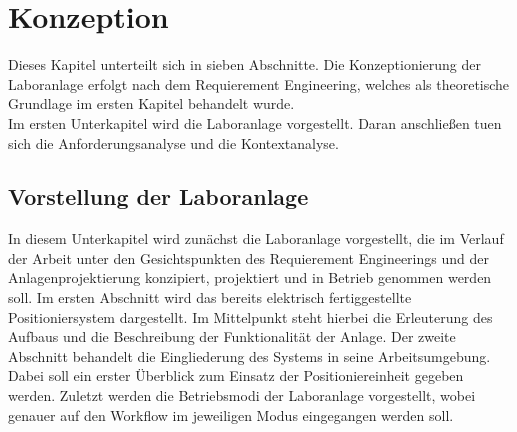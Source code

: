 \documentclass[../Bachelorarbeit.tex]{subfiles}
\begin{document}
\section{Konzeption}
Dieses Kapitel unterteilt sich in sieben Abschnitte. Die Konzeptionierung der Laboranlage erfolgt nach dem Requierement Engineering, welches als theoretische Grundlage im ersten Kapitel behandelt wurde.\\
Im ersten Unterkapitel wird die Laboranlage vorgestellt. Daran anschließen tuen sich die Anforderungsanalyse und die Kontextanalyse.

\subsection{Vorstellung der Laboranlage}
In diesem Unterkapitel wird zunächst die Laboranlage vorgestellt, die im Verlauf der Arbeit unter den Gesichtspunkten des Requierement Engineerings und der Anlagenprojektierung konzipiert, projektiert und in Betrieb genommen werden soll. Im ersten Abschnitt wird das bereits elektrisch fertiggestellte Positioniersystem dargestellt. Im Mittelpunkt steht hierbei die Erleuterung des Aufbaus und die Beschreibung der Funktionalität der Anlage. Der zweite Abschnitt behandelt die Eingliederung des Systems in seine Arbeitsumgebung. Dabei soll ein erster Überblick zum Einsatz der Positioniereinheit gegeben werden. Zuletzt werden die Betriebsmodi der Laboranlage vorgestellt, wobei genauer auf den Workflow im jeweiligen Modus eingegangen werden soll.
\end{document}
